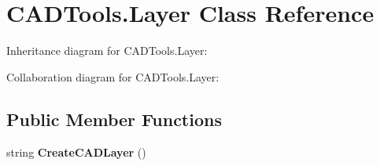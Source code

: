 \hypertarget{class_c_a_d_tools_1_1_layer}{}\section{C\+A\+D\+Tools.\+Layer Class Reference}
\label{class_c_a_d_tools_1_1_layer}


Inheritance diagram for C\+A\+D\+Tools.\+Layer\+:


Collaboration diagram for C\+A\+D\+Tools.\+Layer\+:
\subsection*{Public Member Functions}
\begin{DoxyCompactItemize}
\item 
\mbox{\label{class_c_a_d_tools_1_1_layer_ac9ee6a46fb7b66ded2b47a6446331ca9}} 
string {\bfseries Create\+C\+A\+D\+Layer} ()
\end{DoxyCompactItemize}
